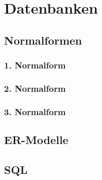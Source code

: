\section{Datenbanken}
\subsection{Normalformen}
\subsubsection{1. Normalform}
\subsubsection{2. Normalform}
\subsubsection{3. Normalform}
\subsection{ER-Modelle}
\subsection{SQL}